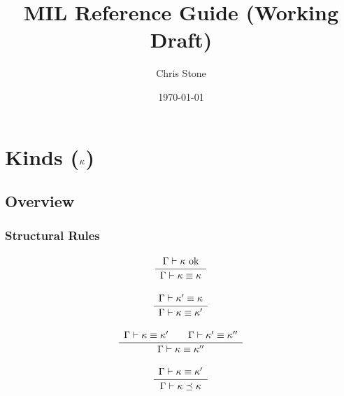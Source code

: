 \documentclass[12pt,twoside,fleqn]{article}
\title{MIL Reference Guide (Working Draft)}
\author{Chris Stone}
\date{\today}
\begin{document}
\maketitle
\raggedbottom

\newcommand{\translate}[1]{\langle{#1}\rangle}
\newcommand{\describe}[7]{
  \subsubsection{#1}
  \begin{tabular}{p{0.8truein}p{5truein}}
  Description&#2\\
  Greek&$#3$\\
  Datatype&\textcd{#4}\\
  PP&\textcd{#5}\\
  Note&#6\\
  Rules&#7\\
\end{tabular}}
  

\newcommand{\irule}[2]
{  \[
    \frac{\begin{array}{c}
              #1
          \end{array}}
         {\begin{array}{c}
              #2
          \end{array}}
  \]}
\newcommand{\allarrowmil}[6]{\forall(#1).(#2;#3)\to^{#4,#5}#6}

\section{Kinds ($\kappa$)} 

\subsection{Overview}

\subsubsection{Structural Rules}

\irule
  {\validkind{\context}{\kind}}
  {\equivkind{\context}{\kind}{\kind}}

\irule
  {\equivkind{\context}{\kind'}{\kind}}
  {\equivkind{\context}{\kind}{\kind'}}

\irule
  {\equivkind{\context}{\kind}{\kind'}\qquad
   \equivkind{\context}{\kind'}{\kind''}}
  {\equivkind{\context}{\kind}{\kind''}}


\irule
  {\equivkind{\context}{\kind}{\kind'}}
  {\subkind{\context}{\kind}{\kind}}
\end{document}
